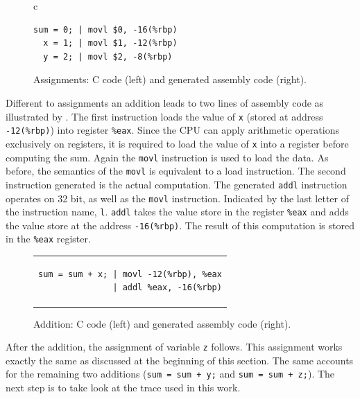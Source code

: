 \documentclass[onecolumn, openright, master, english, signatures]{dbrgrptt}
\begin{document}
\begin{figure}[!ht]
  \centering
  \begin{tabular}{c}
  \begin{lstlisting}
sum = 0; | movl $0, -16(%rbp)
  x = 1; | movl $1, -12(%rbp)
  y = 2; | movl $2, -8(%rbp)
  \end{lstlisting}
  \end{tabular}
  \caption{Assignments: C code (left) and generated assembly code (right).}
  \label{fig:mat-example-comp-assignment}
\end{figure}

Different to assignments an addition leads to two lines of assembly code as illustrated by .
The first instruction loads the value of \texttt{x} (stored at address \texttt{-12(\%rbp)}) into register \texttt{\%eax}.
Since the \ac{CPU} can apply arithmetic operations exclusively on registers, it is required to load the value of \texttt{x} into a register before computing the sum.
Again the \texttt{movl} instruction is used to load the data.
As before, the semantics of the \texttt{movl} is equivalent to a load instruction.
The second instruction generated is the actual computation.
The generated \texttt{addl} instruction operates on 32 bit, as well as the \texttt{movl} instruction.
Indicated by the last letter of the instruction name, \texttt{l}.
\texttt{addl} takes the value store in the register \texttt{\%eax} and adds the value store at the address \texttt{-16(\%rbp)}.
The result of this computation is stored in the \texttt{\%eax} register.

\begin{figure}[!ht]
  \centering
  \begin{tabular}{c}
  \begin{lstlisting}
sum = sum + x; | movl -12(%rbp), %eax
               | addl %eax, -16(%rbp)
  \end{lstlisting}
  \end{tabular}
  \caption{Addition: C code (left) and generated assembly code (right).}
  \label{fig:mat-example-comp-addition}
\end{figure}

After the addition, the assignment of variable \texttt{z} follows.
This assignment works exactly the same as discussed at the beginning of this section.
The same accounts for the remaining two additions (\texttt{sum = sum + y;} and \texttt{sum = sum + z;}).
The next step is to take look at the \ac{trace} used in this work.
\end{document}
